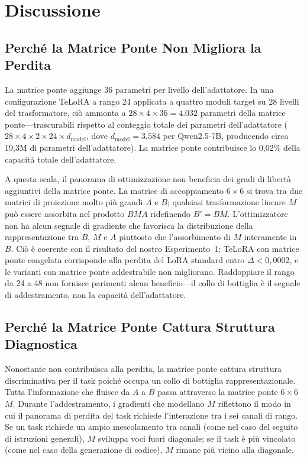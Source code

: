 \documentclass[11pt]{article}
\begin{document}

\section{Discussione}
\label{sec:discussion}

\subsection{Perch\'e la Matrice Ponte Non Migliora la Perdita}

La matrice ponte aggiunge 36 parametri per livello dell'adattatore. In
una configurazione TeLoRA a rango 24 applicata a quattro moduli
target su 28 livelli del trasformatore, ci\`o ammonta a
$28 \times 4 \times 36 = 4.032$ parametri della matrice
ponte---trascurabili rispetto al conteggio totale dei parametri
dell'adattatore
($28 \times 4 \times 2 \times 24 \times d_{\text{model}}$, dove
$d_{\text{model}} = 3.584$ per Qwen2.5-7B, producendo circa 19,3M di
parametri dell'adattatore). La matrice ponte contribuisce lo 0,02\%
della capacit\`a totale dell'adattatore.

A questa scala, il panorama di ottimizzazione non beneficia dei gradi di
libert\`a aggiuntivi della matrice ponte. La matrice di accoppiamento
$6 \times 6$ si trova tra due matrici di proiezione molto pi\`u grandi
$A$ e $B$; qualsiasi trasformazione lineare $M$ pu\`o essere assorbita
nel prodotto $BMA$ ridefinendo $B' = BM$. L'ottimizzatore non ha alcun
segnale di gradiente che favorisca la distribuzione della
rappresentazione tra $B$, $M$ e $A$ piuttosto che l'assorbimento di $M$
interamente in $B$. Ci\`o \`e coerente con il risultato del nostro
Esperimento~1: TeLoRA con matrice ponte congelata corrisponde alla
perdita del LoRA standard entro $\Delta < 0{,}0002$, e le varianti con
matrice ponte addestrabile non migliorano. Raddoppiare il rango da 24 a
48 non fornisce parimenti alcun beneficio---il collo di bottiglia \`e
il segnale di addestramento, non la capacit\`a dell'adattatore.

\subsection{Perch\'e la Matrice Ponte Cattura Struttura Diagnostica}

Nonostante non contribuisca alla perdita, la matrice ponte cattura
struttura discriminativa per il task poich\'e occupa un collo di
bottiglia rappresentazionale. Tutta l'informazione che fluisce da $A$ a
$B$ passa attraverso la matrice ponte $6 \times 6$ $M$. Durante
l'addestramento, i gradienti che modellano $M$ riflettono il modo in
cui il panorama di perdita del task richiede l'interazione tra i sei
canali di rango. Se un task richiede un ampio mescolamento tra canali
(come nel caso del seguito di istruzioni generali), $M$ sviluppa voci
fuori diagonale; se il task \`e pi\`u vincolato (come nel caso della
generazione di codice), $M$ rimane pi\`u vicino alla diagonale.
\end{document}
